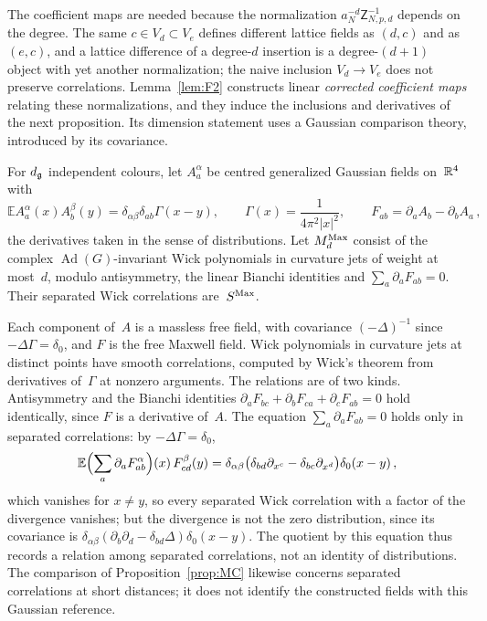 The coefficient maps are needed because the normalization $a_N^{-d}\mathsf Z_{N,p,d}^{-1}$ depends on the degree. The same $c\in V_d\subset V_e$ defines different lattice fields as $(d,c)$ and as $(e,c)$, and a lattice difference of a degree-$d$ insertion is a degree-$(d+1)$ object with yet another normalization; the naive inclusion $V_d\to V_e$ does not preserve correlations. Lemma~\ref{lem:F2} constructs linear \emph{corrected coefficient maps} relating these normalizations, and they induce the inclusions and derivatives of the next proposition. Its dimension statement uses a Gaussian comparison theory, introduced by its covariance.

\begin{definition}\label{def:D11}
For $d_{\mathfrak{g}}$ independent colours, let $A_a^\alpha$ be centred generalized Gaussian fields on~$\mathbb{R}^4$ with
\begin{equation*}
\mathbb E A_a^\alpha(x)A_b^\beta(y)
=\delta_{\alpha\beta}\delta_{ab}\Gamma(x-y),\qquad
\Gamma(x)=\frac1{4\pi^2|x|^2},\qquad F_{ab}=\partial_aA_b-\partial_bA_a\,,
\end{equation*}
the derivatives taken in the sense of distributions. Let $M_{d}^{\mathrm{Max}}$ consist of the complex $\operatorname{Ad}(G)$-invariant Wick polynomials in curvature jets of weight at most~$d$, modulo antisymmetry, the linear Bianchi identities and $\sum_a\partial_aF_{ab}=0$. Their separated Wick correlations are~$S^{\mathrm{Max}}$.
\end{definition}

Each component of~$A$ is a massless free field, with covariance $(-\Delta)^{-1}$ since $-\Delta\Gamma=\delta_0$, and $F$ is the free Maxwell field. Wick polynomials in curvature jets at distinct points have smooth correlations, computed by Wick's theorem from derivatives of~$\Gamma$ at nonzero arguments. The relations are of two kinds. Antisymmetry and the Bianchi identities $\partial_aF_{bc}+\partial_bF_{ca}+\partial_cF_{ab}=0$ hold identically, since $F$ is a derivative of~$A$. The equation $\sum_a\partial_aF_{ab}=0$ holds only in separated correlations: by $-\Delta\Gamma=\delta_0$,
\begin{equation*}
\mathbb E\Bigl(\sum_a\partial_aF^\alpha_{ab}\Bigr)(x)\,F^\beta_{cd}(y)=\delta_{\alpha\beta}\bigl(\delta_{bd}\partial_{x^c}-\delta_{bc}\partial_{x^d}\bigr)\delta_0(x-y)\,,
\end{equation*}
which vanishes for $x\ne y$, so every separated Wick correlation with a factor of the divergence vanishes; but the divergence is not the zero distribution, since its covariance is $\delta_{\alpha\beta}(\partial_b\partial_d-\delta_{bd}\Delta)\delta_0(x-y)$. The quotient by this equation thus records a relation among separated correlations, not an identity of distributions. The comparison of Proposition~\ref{prop:MC} likewise concerns separated correlations at short distances; it does not identify the constructed fields with this Gaussian reference.


